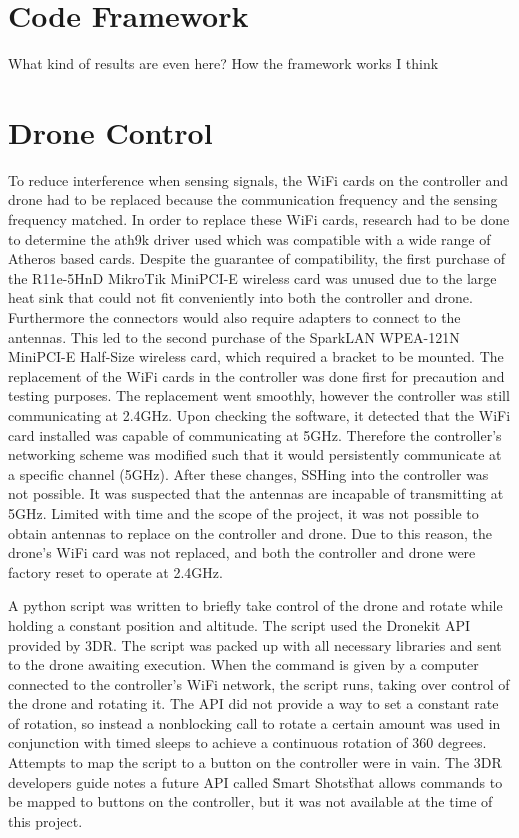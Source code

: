 \section{Code Framework}
What kind of results are even here? How the framework works I think

\section{Drone Control}
To reduce interference when sensing signals, the WiFi cards on the controller and drone had to be replaced because the communication frequency and the sensing frequency matched. In order to replace these WiFi cards, research had to be done to determine the ath9k driver used which was compatible with a wide range of Atheros based cards. Despite the guarantee of compatibility, the first purchase of the R11e-5HnD MikroTik MiniPCI-E wireless card was unused due to the large heat sink that could not fit conveniently into both the controller and drone. Furthermore the connectors would also require adapters to connect to the antennas. This led to the second purchase of the SparkLAN WPEA-121N MiniPCI-E Half-Size wireless card, which required a bracket to be mounted. The replacement of the WiFi cards in the controller was done first for precaution and testing purposes. The replacement went smoothly, however the controller was still communicating at 2.4GHz. Upon checking the software, it detected that the WiFi card installed was capable of communicating at 5GHz. Therefore the controller's networking scheme was modified such that it would persistently communicate at a specific channel (5GHz). After these changes, SSHing into the controller was not possible. It was suspected that the antennas are incapable of transmitting at 5GHz. Limited with time and the scope of the project, it was not possible to obtain antennas to replace on the controller and drone. Due to this reason, the drone's WiFi card was not replaced, and both the controller and drone were factory reset to operate at 2.4GHz. \par

A python script was written to briefly take control of the drone and rotate while holding a constant position and altitude. The script used the Dronekit API provided by 3DR. The script was packed up with all necessary libraries and sent to the drone awaiting execution. When the command is given by a computer connected to the controller's WiFi network, the script runs, taking over control of the drone and rotating it. The API did not provide a way to set a constant rate of rotation, so instead a nonblocking call to rotate a certain amount was used in conjunction with timed sleeps to achieve a continuous rotation of 360 degrees. Attempts to map the script to a button on the controller were in vain. The 3DR developers guide notes a future API called \"Smart Shots\" that allows commands to be mapped to buttons on the controller, but it was not available at the time of this project.

